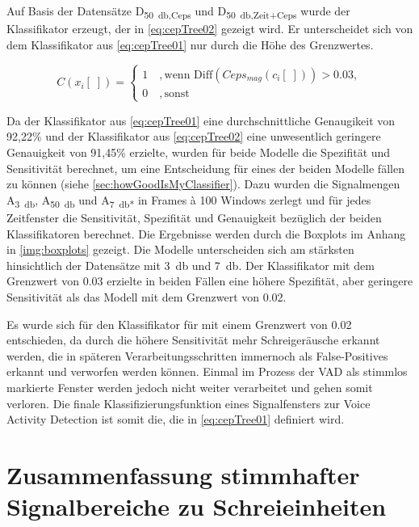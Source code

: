 Auf Basis der Datensätze D\textsubscript{\SI{50}{\decibel},Ceps} und D\textsubscript{\SI{50}{\decibel},Zeit+Ceps} wurde der Klassifikator erzeugt, der in \autoref{eq:cepTree02} gezeigt wird. Er unterscheidet sich von dem Klassifikator aus \autoref{eq:cepTree01} nur durch die Höhe des Grenzwertes.

\begin{equation}
C(x_i[\;]) = \begin{cases}
1 \quad , \text{wenn  Diff}(Ceps_{mag}(c_i[\;])) > 0.03, \\
0 \quad , \text{sonst}
\end{cases}
\label{eq:cepTree02}
\end{equation}

Da der Klassifikator aus \autoref{eq:cepTree01} eine durchschnittliche Genaugikeit von 92,22\% und der Klassifikator aus \autoref{eq:cepTree02} eine unwesentlich geringere Genauigkeit von 91,45\% erzielte, wurden für beide Modelle die Spezifität und Sensitivität berechnet, um eine Entscheidung für eines der beiden Modelle fällen zu können (siehe \autoref{sec:howGoodIsMyClassifier}). Dazu wurden die Signalmengen A\textsubscript{\SI{3}{\decibel}}, A\textsubscript{\SI{50}{\decibel}} und A\textsubscript{\SI{7}{\decibel}*} in Frames \`{a} 100 Windows zerlegt und für jedes Zeitfenster die Sensitivität, Spezifität und Genauigkeit bezüglich der beiden Klassifikatoren berechnet. Die Ergebnisse werden durch die Boxplots im Anhang in \autoref{img:boxplots} gezeigt. Die Modelle unterscheiden sich am stärksten hinsichtlich der Datensätze mit \SI{3}{\decibel} und \SI{7}{\decibel}. Der Klassifikator mit dem Grenzwert von 0.03 erzielte in beiden Fällen eine höhere Spezifität, aber geringere Sensitivität als das Modell mit dem Grenzwert von 0.02. 

Es wurde sich für den Klassifikator für mit einem Grenzwert von 0.02 entschieden, da durch die höhere Sensitivität mehr Schreigeräusche erkannt werden, die in späteren Verarbeitungsschritten immernoch als False-Positives erkannt und verworfen werden können. Einmal im Prozess der VAD als stimmlos markierte Fenster werden jedoch nicht weiter verarbeitet und gehen somit \glqq verloren\grqq. Die finale Klassifizierungsfunktion eines Signalfensters zur Voice Activity Detection ist somit die, die in \autoref{eq:cepTree01} definiert wird.

\section{Zusammenfassung stimmhafter Signalbereiche zu Schreieinheiten}
\label{sec:marking_cry-units_new}

